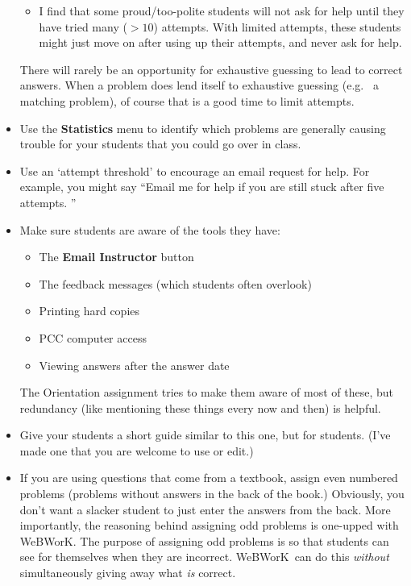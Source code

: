 \documentclass[12pt]{article}
\newcommand{\menu}[1]{\textbf{#1}}
\newcommand{\WW}{WeBWorK}
\begin{document}
\begin{itemize}
\begin{itemize}
		      \item I find that some proud/too-polite students will not ask for help until they have tried many ($>\!\!10$) attempts.
		            With limited attempts, these students might just move on after using up their attempts, and never ask for help.

	      \end{itemize}

	      There will rarely be an opportunity for exhaustive guessing to lead to correct answers.
	      When a problem does lend itself to exhaustive guessing (e.g.
	      \ a matching problem), of course that is a good time to limit attempts.

	\item Use the \menu{Statistics} menu to identify which problems are generally causing trouble for your students that you could go over in class.

	\item Use an `attempt threshold' to encourage an email request for help.
	      For example, you might say ``Email me for help if you are still stuck after five attempts.
	      ''

	\item Make sure students are aware of the tools they have:
	      \begin{itemize}
		      \item The \menu{Email Instructor} button
		      \item The feedback messages (which students often overlook)
		      \item Printing hard copies
		      \item PCC computer access
		      \item Viewing answers after the answer date
	      \end{itemize}
	      The Orientation assignment tries to make them aware of most of these, but redundancy (like mentioning these things every now and then) is helpful.

	\item Give your students a short guide similar to this one, but for students.  (I've made one that you are welcome to use or edit.)

	\item If you are using questions that come from a textbook, assign even numbered problems (problems without answers in the back of the book.)  Obviously, you don't want a slacker student to just enter the answers from the back.
	      More importantly, the reasoning behind assigning odd problems is one-upped with \WW.
	      The purpose of assigning odd problems is so that students can see for themselves when they are incorrect.
	      \WW\ can do this \emph{without} simultaneously giving away what \emph{is} correct.


\end{itemize}
\end{document}
